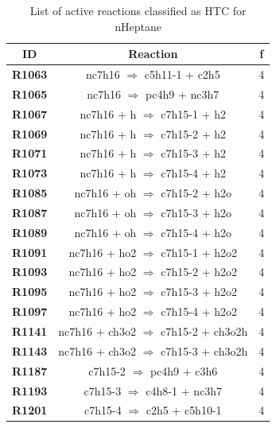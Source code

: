 \begin{table}[!ht]
\centering
\caption{List of active reactions classified as HTC for nHeptane}
\label{table:nHeptane_HTC}
\begin{tabular}{ccc}
\hline
\textbf{ID} & \textbf{Reaction} & \textbf{f} \\
\hline
\textbf{R1063} & nc7h16 $\Rightarrow$ c5h11-1 + c2h5 & 4 \\
\textbf{R1065} & nc7h16 $\Rightarrow$ pc4h9 + nc3h7 & 4 \\
\textbf{R1067} & nc7h16 + h $\Rightarrow$ c7h15-1 + h2 & 4 \\
\textbf{R1069} & nc7h16 + h $\Rightarrow$ c7h15-2 + h2 & 4 \\
\textbf{R1071} & nc7h16 + h $\Rightarrow$ c7h15-3 + h2 & 4 \\
\textbf{R1073} & nc7h16 + h $\Rightarrow$ c7h15-4 + h2 & 4 \\
\textbf{R1085} & nc7h16 + oh $\Rightarrow$ c7h15-2 + h2o & 4 \\
\textbf{R1087} & nc7h16 + oh $\Rightarrow$ c7h15-3 + h2o & 4 \\
\textbf{R1089} & nc7h16 + oh $\Rightarrow$ c7h15-4 + h2o & 4 \\
\textbf{R1091} & nc7h16 + ho2 $\Rightarrow$ c7h15-1 + h2o2 & 4 \\
\textbf{R1093} & nc7h16 + ho2 $\Rightarrow$ c7h15-2 + h2o2 & 4 \\
\textbf{R1095} & nc7h16 + ho2 $\Rightarrow$ c7h15-3 + h2o2 & 4 \\
\textbf{R1097} & nc7h16 + ho2 $\Rightarrow$ c7h15-4 + h2o2 & 4 \\
\textbf{R1141} & nc7h16 + ch3o2 $\Rightarrow$ c7h15-2 + ch3o2h & 4 \\
\textbf{R1143} & nc7h16 + ch3o2 $\Rightarrow$ c7h15-3 + ch3o2h & 4 \\
\textbf{R1187} & c7h15-2 $\Rightarrow$ pc4h9 + c3h6 & 4 \\
\textbf{R1193} & c7h15-3 $\Rightarrow$ c4h8-1 + nc3h7 & 4 \\
\textbf{R1201} & c7h15-4 $\Rightarrow$ c2h5 + c5h10-1 & 4 \\
\hline
\end{tabular}
\end{table}